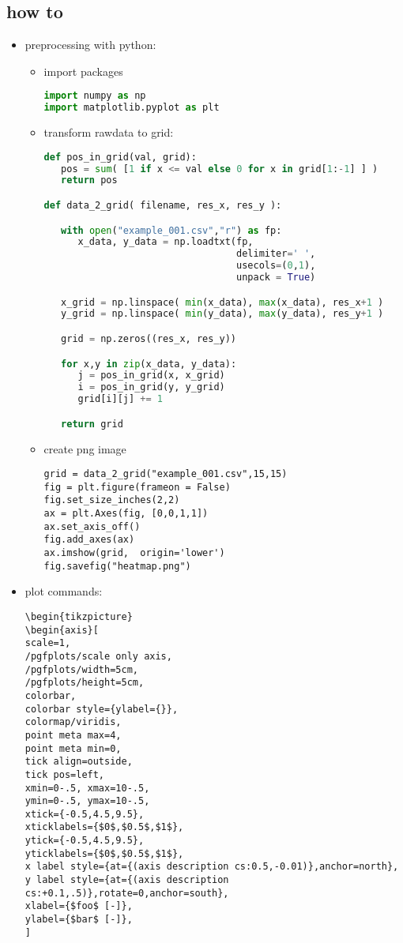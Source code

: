 \subsection{how to}
\begin{itemize}
	\item preprocessing with python:
	\begin{itemize}
		\item import packages
	\begin{lstlisting}[language = python]
import numpy as np
import matplotlib.pyplot as plt
\end{lstlisting}
	\item transform rawdata to grid:
	\begin{lstlisting}[language = python]
def pos_in_grid(val, grid):
   pos = sum( [1 if x <= val else 0 for x in grid[1:-1] ] )
   return pos

def data_2_grid( filename, res_x, res_y ):

   with open("example_001.csv","r") as fp:
      x_data, y_data = np.loadtxt(fp,
                                  delimiter=' ',
                                  usecols=(0,1),
                                  unpack = True)

   x_grid = np.linspace( min(x_data), max(x_data), res_x+1 )
   y_grid = np.linspace( min(y_data), max(y_data), res_y+1 )

   grid = np.zeros((res_x, res_y))

   for x,y in zip(x_data, y_data):
      j = pos_in_grid(x, x_grid)
      i = pos_in_grid(y, y_grid)
      grid[i][j] += 1

   return grid
	\end{lstlisting}
	\item create png image
	\begin{lstlisting}
grid = data_2_grid("example_001.csv",15,15)
fig = plt.figure(frameon = False)
fig.set_size_inches(2,2)
ax = plt.Axes(fig, [0,0,1,1])
ax.set_axis_off()
fig.add_axes(ax)
ax.imshow(grid,  origin='lower')
fig.savefig("heatmap.png")
	\end{lstlisting}
	\end{itemize}

\item plot commands:

\begin{lstlisting}
\begin{tikzpicture}
\begin{axis}[
scale=1,
/pgfplots/scale only axis,
/pgfplots/width=5cm,
/pgfplots/height=5cm,
colorbar,
colorbar style={ylabel={}},
colormap/viridis,
point meta max=4,
point meta min=0,
tick align=outside,
tick pos=left,
xmin=0-.5, xmax=10-.5,
ymin=0-.5, ymax=10-.5,
xtick={-0.5,4.5,9.5},
xticklabels={$0$,$0.5$,$1$},
ytick={-0.5,4.5,9.5},
yticklabels={$0$,$0.5$,$1$},
x label style={at={(axis description cs:0.5,-0.01)},anchor=north},
y label style={at={(axis description cs:+0.1,.5)},rotate=0,anchor=south},
xlabel={$foo$ [-]},
ylabel={$bar$ [-]},
]


\end{lstlisting}
\end{itemize}

